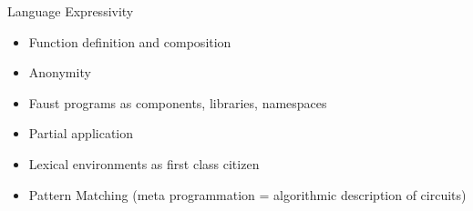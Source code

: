 
\begin{frame}[fragile]{Language Expressivity}
    \begin{itemize}
        \item Function definition and composition
        \item Anonymity
        \item Faust programs as components, libraries, namespaces
        \item Partial application
        \item Lexical environments as first class citizen
        \item Pattern Matching (meta programmation = algorithmic description of circuits)
    \end{itemize}
\end{frame}

